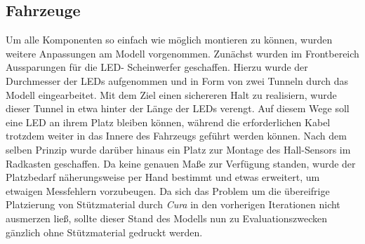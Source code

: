 \documentclass[.../Dokumentation.tex]{subfiles}
\begin{document}
\subsection{Fahrzeuge}\label{sec-ita3-cars}
Um alle Komponenten so einfach wie möglich montieren zu können, wurden 
weitere Anpassungen am Modell vorgenommen. 
Zunächst wurden im Frontbereich Aussparungen für die LED-\grqq 
Scheinwerfer\grqq{} geschaffen. Hierzu wurde der Durchmesser der LEDs 
aufgenommen und in Form von zwei \grqq Tunneln\grqq{} durch das Modell 
eingearbeitet. Mit dem Ziel einen sichereren Halt zu realisiern, wurde dieser 
Tunnel in etwa hinter der Länge der LEDs verengt. Auf diesem Wege soll eine 
LED an ihrem Platz bleiben können, während die erforderlichen Kabel trotzdem 
weiter in das Innere des Fahrzeugs geführt werden können.
Nach dem selben Prinzip wurde darüber hinaus ein Platz zur Montage des 
Hall-Sensors im Radkasten geschaffen. Da keine genauen Maße zur Verfügung 
standen, wurde der Platzbedarf näherungsweise per Hand bestimmt und etwas 
erweitert, um etwaigen Messfehlern vorzubeugen.
Da sich das Problem um die übereifrige Platzierung von Stützmaterial durch 
\textit{Cura} in den vorherigen Iterationen nicht ausmerzen ließ, sollte 
dieser Stand des Modells nun zu Evaluationszwecken gänzlich ohne Stützmaterial 
gedruckt werden.
\end{document}
